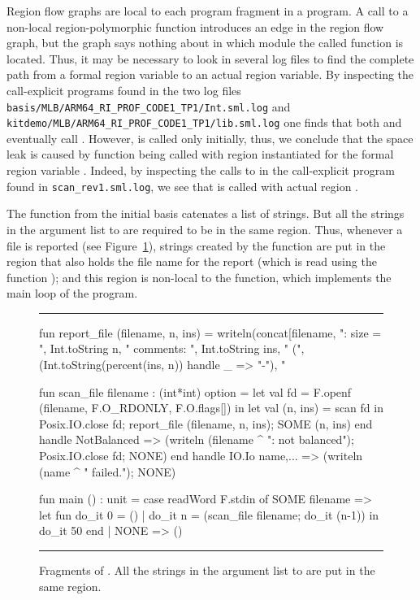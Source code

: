 \documentclass[12pt]{book}
\begin{document}
Region flow graphs are local to each program fragment in a program. A call to a
non-local region-polymorphic function introduces an edge in the region flow
graph, but the graph says nothing about in which module the called function is
located. Thus, it may be necessary to look in several log files to find the complete path
from a formal region variable to an actual region variable. By inspecting the
call-explicit programs found in the two log files \lstinline{basis/MLB/ARM64_RI_PROF_CODE1_TP1/Int.sml.log} and
\lstinline{kitdemo/MLB/ARM64_RI_PROF_CODE1_TP1/lib.sml.log} one finds that both  and 
eventually call . However,  is called only initially,
thus, we conclude that the space leak is caused by function 
being called with region  instantiated for the formal region
variable . Indeed, by inspecting the calls to  in the
call-explicit program found in \lstinline{scan_rev1.sml.log}, we see that
 is called with actual region .

The  function from the initial basis catenates a list of strings. But
all the strings in the argument list to  are required to be in the
same region. Thus, whenever a file is reported (see
Figure~\ref{report_file.fig}), strings created by the  function
are put in the region that also holds the file name for the report (which is
read using the function ); and this region is non-local to the
 function, which implements the main loop of the program.
\begin{figure}
\hrule \medskip
\begin{smlcode}
  fun report_file (filename, n, ins) =
      writeln(concat[filename, ": size = ", Int.toString n,
                     " comments: ", Int.toString ins, " (",
                     (Int.toString(percent(ins, n))
                      handle _ => "-"), "%

  fun scan_file filename : (int*int) option =
      let val fd = F.openf (filename, F.O_RDONLY, F.O.flags[])
      in let val (n, ins) = scan fd
         in Posix.IO.close fd;
            report_file (filename, n, ins);
            SOME (n, ins)
         end handle NotBalanced =>
                    (writeln (filename ^ ": not balanced");
                     Posix.IO.close fd;
                     NONE)
      end handle IO.Io {name,...} =>
                 (writeln (name ^ " failed."); NONE)

  fun main () : unit =
      case readWord F.stdin of
          SOME filename =>
          let fun do_it 0 = ()
                | do_it n = (scan_file filename; do_it (n-1))
          in do_it 50
          end
        | NONE => ()
\end{smlcode}
\caption{Fragments of . All the strings in the argument list
  to  are put in the same region.}
\label{report_file.fig}
\medskip \hrule
\end{figure}
\end{document}
